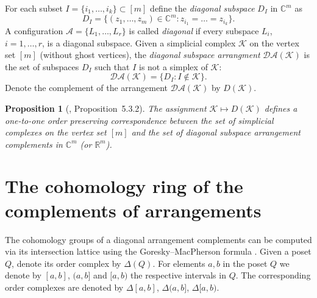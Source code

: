 \documentclass[a4paper,12pt]{amsart}
\newcommand{\K}{\mathcal K}
\newcommand{\RR}{\mathbb R}
\newcommand{\CC}{\mathbb C}
\newtheorem{proposition}[formula]{Proposition}
\theoremstyle{definition}
\theoremstyle{remark}
\numberwithin{equation}{section}
\begin{document}
For each subset $I = \{ i_1, \dots, i_k\} \subset [m]$ define the \textit{diagonal subspace} $D_I$ in $\CC^m$ as
	$$D_I = \{(z_1, \dots, z_m) \in \CC^m : z_{i_1} = \dots = z_{i_k} \}. $$
A configuration $\mathcal{A} = \{L_1, \dots, L_r \}$ is called \textit{diagonal} if every subspace $L_i$, $i = 1, \dots, r$, is a diagonal subspace.
Given a simplicial complex $\K$ on the vertex set $[m]$ (without ghost vertices), the \textit{diagonal subspace arrangment} $\mathcal{DA}(\K)$
is the set of subspaces $D_I$ such that $I$ is not a simplex of $\K$:
$$\mathcal{DA}(\K) = \{D_I : I \notin \K \}.$$
Denote the complement of the arrangement $\mathcal{DA}(\K)$ by $D(\K)$.

\begin{proposition}[\cite{BP00}, Proposition~5.3.2]
The assignment $\K \mapsto D(\K)$ defines a one-to-one order preserving correspondence between the set of simplicial complexes on
the vertex set $[m]$ and the set of diagonal subspace arrangement complements in $\CC^m$ (or $\RR^m$).
\end{proposition}

\section{The cohomology ring of the complements of arrangements}
The cohomology groups of a diagonal arrangement complements can be computed via its intersection lattice using the Goresky--MacPherson formula \cite{GM}.
Given a poset $Q$, denote its order complex by $\Delta(Q)$.
For elements $a, b$ in the poset $Q$ we denote by $[a, b]$, $(a, b]$ and $[a, b)$ 
the respective intervals in $Q$. The corresponding order complexes are denoted by $\Delta[a, b]$, $\Delta(a, b]$, $\Delta[a, b)$.
\end{document}
